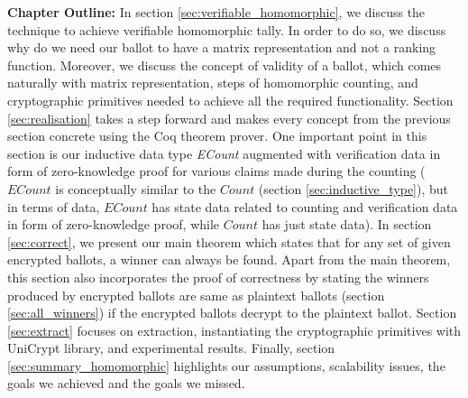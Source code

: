 \textbf{Chapter Outline:} In section \ref{sec:verifiable_homomorphic}, 
we discuss the technique to achieve verifiable homomorphic tally. In order to do so, 
we discuss why do we need our ballot to have a matrix representation 
and not a ranking function. Moreover, we discuss the concept 
of validity of a ballot, which comes naturally with matrix representation, 
steps of homomorphic counting, and cryptographic primitives needed 
to achieve all the required functionality. Section \ref{sec:realisation} 
takes a step forward and makes every concept from the previous section
concrete using the Coq theorem prover. One important point 
in this section is our inductive data type \textit{ECount}
augmented with verification data in form of zero-knowledge proof 
for various claims made during the counting 
($ECount$ is conceptually similar to the $Count$ (section \ref{sec:inductive_type}), but 
in terms of data, $ECount$ has state data related to counting and verification data
in form of zero-knowledge proof, while $Count$ 
has just state data).  In section \ref{sec:correct}, we present
our main theorem which states that for any set of given encrypted ballots, 
a winner can always be found. Apart from the main theorem, this section 
also incorporates the proof of correctness by stating 
the winners produced by encrypted ballots are same as 
plaintext ballots (section \ref{sec:all_winners}) if 
 the encrypted ballots decrypt to the plaintext ballot. 
 Section \ref{sec:extract} focuses on extraction, instantiating 
 the cryptographic primitives with UniCrypt library, and 
 experimental results. Finally, section \ref{sec:summary_homomorphic} 
 highlights our assumptions, scalability issues, the 
 goals we achieved and the goals we missed. 


 


